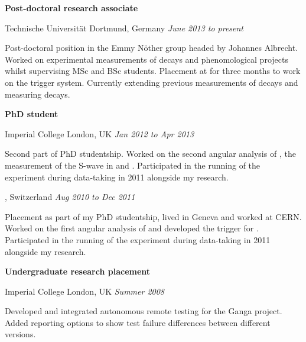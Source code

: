 \documentclass[10pt]{article}
\renewenvironment{compactitem}{
  \begin{list}{}{
    \setlength{\leftmargin}{1.5em}
  }
}{
  \end{list}
}
\def\tud{Technische Universit\"at Dortmund}
\def\icl{Imperial College London}
\begin{document}
\textbf{Post-doctoral research associate}
\begin{compactitem}
\item {\tud, Germany}  \hfill \textit{June 2013 to present}
\begin{compactitem}
\item Post-doctoral position in the Emmy N\"other group headed by Johannes Albrecht. %
Worked on experimental measurements of \btosll decays and phenomological projects whilst supervising MSc and BSc students.
Placement at \cern for three months to work on the \lhcb trigger system.
Currently extending previous measurements of \btosll decays and measuring \btodll decays.
\end{compactitem}
\end{compactitem}

\textbf{PhD student}
\begin{compactitem}
\item \icl, UK    \hfill \textit{Jan 2012 to Apr 2013}
\begin{compactitem}
\item Second part of PhD studentship.
Worked on the second angular analysis of \BdKstmm, the measurement of the \kpi S-wave in \BdKstmm and .
Participated in the running of the \lhcb experiment during data-taking in 2011 alongside my research. 
\end{compactitem}
\cern, Switzerland   \hfill \textit{Aug 2010 to Dec 2011}
\begin{compactitem}
\item Placement as part of my PhD studentship, lived in Geneva and worked at CERN.
Worked on the first angular analysis of \BdKstmm and developed the trigger for \lhcb.
Participated in the running of the \lhcb experiment during data-taking in 2011 alongside my research. 
\end{compactitem}
\end{compactitem}

\textbf{Undergraduate research placement} 
\begin{compactitem}
\item \icl, UK    \hfill \textit{Summer 2008}
\begin{compactitem}
\item Developed and integrated autonomous remote testing for the Ganga project.  
Added reporting options to show test failure differences between different versions.
\end{compactitem}
\end{compactitem}
\end{document}
